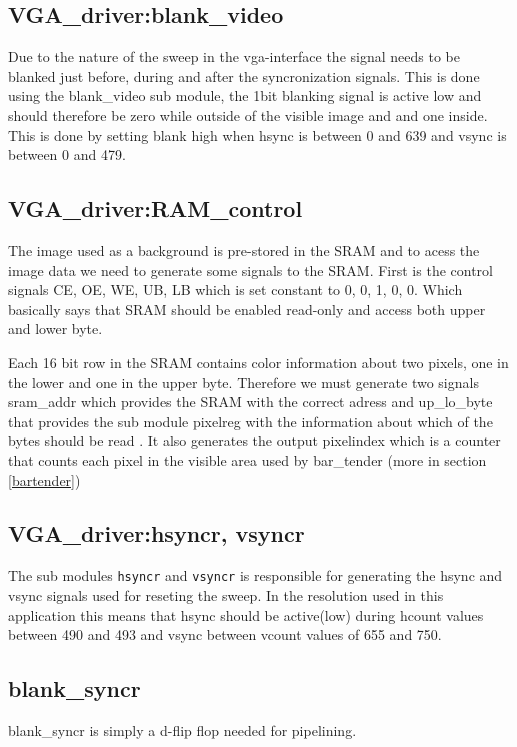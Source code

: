 \subsection{VGA\_driver:blank\_video}

Due to the nature of the sweep in the vga-interface the signal needs to be blanked just before,
during and after the syncronization signals. This is done using the blank\_video sub module,
the 1bit blanking signal is active low and should therefore be zero while outside of the visible image and
and one inside. This is done by setting blank high when hsync is between 0 and 639 and vsync is between
0 and 479.    

\subsection{VGA\_driver:RAM\_control}
The image used as a background is pre-stored in the SRAM and to acess the image data we need to generate
some signals to the SRAM. First is the control signals CE, OE, WE, UB, LB which is set constant to
0, 0, 1, 0, 0. Which basically says that SRAM should be enabled read-only and access both upper and lower byte.

Each 16 bit row in the SRAM contains color information about two pixels, one in the lower and one in the upper
byte. Therefore we must generate two signals sram\_addr which provides the SRAM with the correct adress and 
up\_lo\_byte that provides the sub module pixelreg with the information about which of the bytes should be read .
It also generates the output pixelindex which is a counter that counts each pixel in the visible area used
by bar\_tender (more in section \ref{bartender})   

\subsection{VGA\_driver:hsyncr, vsyncr}
The sub modules \verb+hsyncr+ and \verb+vsyncr+ is responsible for generating the hsync and vsync signals used for reseting
the sweep. In the resolution used in this application this means that hsync should be active(low) during 
hcount values between 490 and 493 and vsync between vcount values of 655 and 750.   

\subsection{blank\_syncr}
blank\_syncr is simply a d-flip flop needed for pipelining.

